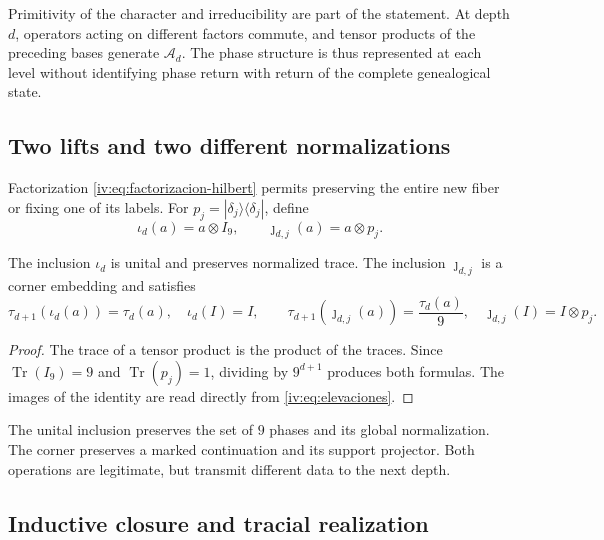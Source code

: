 Primitivity of the character and irreducibility are part of the
statement. At depth \(d\), operators acting on different
factors commute, and tensor products of the preceding bases
generate \(\mathcal A_d\). The phase structure is thus
represented at each level without identifying phase return with
return of the complete genealogical state.

\subsection{Two lifts and two different normalizations}

Factorization \eqref{iv:eq:factorizacion-hilbert} permits preserving
the entire new fiber or fixing one of its labels. For
\(p_j=|\delta_j\rangle\langle\delta_j|\), define
\begin{equation}
 \iota_d(a)=a\otimes I_9,
 \qquad \jmath_{d,j}(a)=a\otimes p_j.
 \label{iv:eq:elevaciones}
\end{equation}
\begin{proposition}
\label{iv:prop:unidad-traza}
The inclusion \(\iota_d\) is unital and preserves normalized trace.
The inclusion \(\jmath_{d,j}\) is a corner embedding and
satisfies
\[
 \tau_{d+1}(\iota_d(a))=\tau_d(a),\quad \iota_d(I)=I,
 \qquad
 \tau_{d+1}(\jmath_{d,j}(a))=\frac{\tau_d(a)}9,
 \quad \jmath_{d,j}(I)=I\otimes p_j.
\]
\end{proposition}
\begin{proof}
The trace of a tensor product is the product of the traces.
Since \(\operatorname{Tr}(I_9)=9\) and
\(\operatorname{Tr}(p_j)=1\), dividing by \(9^{d+1}\)
produces both formulas. The images of the identity are read
directly from \eqref{iv:eq:elevaciones}.
\end{proof}

The unital inclusion preserves the set of \(9\) phases and its
global normalization. The corner preserves a marked continuation and
its support projector. Both operations are legitimate, but
transmit different data to the next depth.

\begingroup
\fontsize{10.5}{12.9}\selectfont
\setlength{\parskip}{2pt plus .5pt}
\subsection{Inductive closure and tracial realization}

